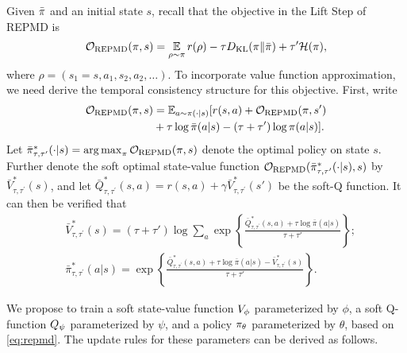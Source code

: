 Given $\bar{\pi}$ and an initial state $s$,
recall that the objective in the Lift Step of REPMD is
\begin{equation*}
	{\mathcal{O}}_{\text{REPMD}}(\pi, s) =   \operatorname*{\mathbb{E}}\limits_{\rho \sim \pi}{  r(\rho)  - \tau D_{\mathrm{KL}}(\pi \| \bar{\pi}) + \tau^{\prime} \mathcal{H}(\pi)},
\end{equation*}
where $\rho=  (s_1 = s, a_1, s_2, a_2, \ldots)$.
To incorporate value function approximation, we need derive 
the temporal consistency structure for this objective.
First, write
\begin{equation*}
\begin{split}
 {\mathcal{O}}_{\text{REPMD}}(\pi, s) &= \mathbb{E}_{a\sim \pi(\cdot \vert s)} [ r(s,a) + {\mathcal{O}}_{\text{REPMD}}(\pi, s') \\
 &+ \tau \log \bar{\pi}(a|s) - \left(\tau+ \tau' \right) \log \pi(a|s) ].
\end{split}
\end{equation*}
Let $\bar{\pi}_{\tau,\tau^{\prime}}^* (\cdot|s) = \operatorname*{arg\,max}_{\pi} {\mathcal{O}}_{\text{REPMD}}(\pi, s) $ denote the optimal policy on state $s$. 
%
Further denote the soft optimal state-value function ${\mathcal{O}}_{\text{REPMD}}(\bar{\pi}_{\tau,\tau^{\prime}}^* (\cdot|s), s)$ by $\bar{V}_{\tau,\tau^{\prime}}^*(s)$, and let  $\bar{Q}_{\tau,\tau^{\prime}}^*(s,a) = r(s,a) + \gamma \bar{V}_{\tau,\tau^{\prime}}^*(s')$ be the soft-Q function.
It can then be verified that 
%
{\small
\begin{equation}
\begin{split}
& \bar{V}_{\tau,\tau^{\prime}}^*(s) = (\tau + \tau') \log \sum_a \exp \left\{ \frac{\bar{Q}_{\tau,\tau^{\prime}}^*(s,a) + \tau \log \bar{\pi}(a|s)} {\tau + \tau'} \right\}; \\
& \bar{\pi}_{\tau,\tau^{\prime}}^* (a|s) = \exp \left\{ \frac{\bar{Q}_{\tau,\tau^{\prime}}^*(s,a) + \tau \log \bar{\pi}(a|s) - \bar{V}_{\tau,\tau^{\prime}}^*(s)}{\tau + \tau'} \right\}.
\end{split}
\label{soft-v-and-pi}
\end{equation}
}
 
We propose to train a
soft state-value function $V_{\phi}$ parameterized by $\phi$,
a soft Q-function $Q_{\psi}$ parameterized by $\psi$,
and a policy $\pi_{\theta}$ parameterized by $\theta$,
based on \cref{eq:repmd}.
The update rules for these parameters can be derived as follows.

